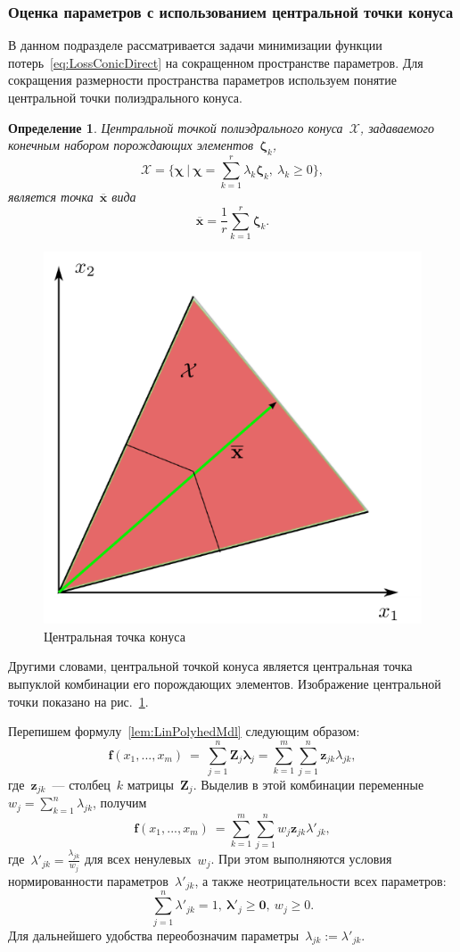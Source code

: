 \documentclass{elsarticle}
\newcommand{\bz}{\mathbf{z}}
\newcommand{\bx}{\mathbf{x}}
\newcommand{\bfx}{\mathbf{f}}
\newcommand{\bZ}{\mathbf{Z}}
\newcommand{\bchi}{\boldsymbol{\chi}}
\newcommand{\bzeta}{\boldsymbol{\zeta}}
\newcommand{\blambda}{\boldsymbol{\lambda}}
\newcommand{\cX}{\mathcal{X}}
\newtheorem{df}{Определение}
\begin{document}
\subsubsection{Оценка параметров с использованием центральной точки конуса}
\label{subsec:ConeReg}
В данном подразделе рассматривается задачи минимизации функции потерь~\eqref{eq:LossConicDirect} на сокращенном пространстве параметров.
Для сокращения размерности пространства параметров используем понятие центральной точки полиэдрального конуса. %
\begin{df}
Центральной точкой полиэдрального конуса~$\cX$, задаваемого конечным набором порождающих элементов~$\bzeta_{k}$,
\[
\cX=\{\bchi~|~\bchi=\sum\limits_{k=1}^{r}\lambda_{k}\bzeta_{k},~\lambda_{k}\geq 0\},
\]
является точка~$\overline{\bx}$ вида
\[
\overline{\bx}=\frac{1}{r}\sum\limits_{k=1}^{r}\bzeta_{k}.
\]
\end{df}
\begin{figure}[h]
\begin{center}
\includegraphics[width=.5\textwidth]{coneCentralPoint.png}
\caption{Центральная точка конуса}
\label{fig:ConeCentralPoint}
\end{center}
\end{figure}
Другими словами, центральной точкой конуса является центральная точка выпуклой комбинации его порождающих элементов. Изображение центральной точки показано на рис.~\ref{fig:ConeCentralPoint}.

Перепишем формулу~\eqref{lem:LinPolyhedMdl} следующим образом:
\[
\bfx(x_1,...,x_m)~=~\sum\limits_{j=1}^n\bZ_j\blambda_j=\sum\limits_{k=1}^m\sum\limits_{j=1}^n\bz_{jk}\lambda_{jk},
\]
где~$\bz_{jk}$~--- столбец~$k$ матрицы~$\bZ_j$. Выделив в этой комбинации переменные~$w_j=\sum\limits_{k=1}^n \lambda_{jk}$, получим
\[
\bfx(x_1,...,x_m)~=\sum\limits_{k=1}^m\sum\limits_{j=1}^n w_j \bz_{jk}\lambda'_{jk},
\]
где~$\lambda'_{jk}=\frac{\lambda_{jk}}{w_j}$ для всех ненулевых~$w_j$. При этом выполняются условия нормированности параметров~$\lambda'_{jk}$, а также неотрицательности всех параметров:
\[
\sum\limits_{j=1}^n\lambda'_{jk}=1,~\blambda'_j\geq\mathbf{0},~w_j\geq 0.
 \]
Для дальнейшего удобства переобозначим параметры~$\lambda_{jk}:=\lambda'_{jk}$.
\end{document}
